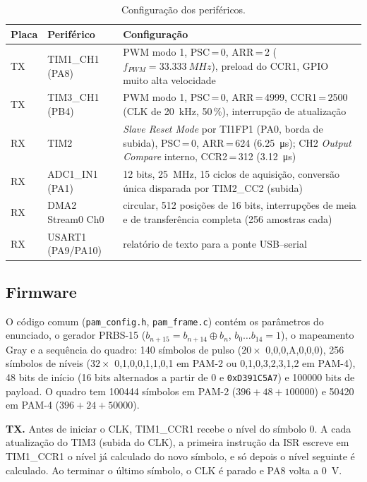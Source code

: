 \documentclass[12pt,a4paper]{article}
\begin{document}
\begin{table}[H]
\centering
\caption{Configuração dos periféricos.}
\label{tab:ioc}
\small
\begin{tabularx}{\textwidth}{l l X}
\toprule
Placa & Periférico & Configuração \\
\midrule
TX & TIM1\_CH1 (PA8) & PWM modo 1, PSC\,=\,0, ARR\,=\,2 ($f_{PWM}=\SI{33,333}{MHz}$), preload do CCR1, GPIO muito alta velocidade \\
TX & TIM3\_CH1 (PB4) & PWM modo 1, PSC\,=\,0, ARR\,=\,4999, CCR1\,=\,2500 (CLK de \SI{20}{kHz}, 50\,\%), interrupção de atualização \\
RX & TIM2 & \textit{Slave Reset Mode} por TI1FP1 (PA0, borda de subida), PSC\,=\,0, ARR\,=\,624 (\SI{6,25}{\micro\second}); CH2 \textit{Output Compare} interno, CCR2\,=\,312 (\SI{3,12}{\micro\second}) \\
RX & ADC1\_IN1 (PA1) & 12 bits, \SI{25}{MHz}, 15 ciclos de aquisição, conversão única disparada por TIM2\_CC2 (subida) \\
RX & DMA2 Stream0 Ch0 & circular, 512 posições de 16 bits, interrupções de meia e de transferência completa (256 amostras cada) \\
RX & USART1 (PA9/PA10) & relatório de texto para a ponte USB--serial \\
\bottomrule
\end{tabularx}
\end{table}

\subsection{Firmware}

O código comum (\texttt{pam\_config.h}, \texttt{pam\_frame.c}) contém os parâmetros do enunciado,
o gerador PRBS-15 ($b_{n+15} = b_{n+14}\oplus b_n$, $b_0\ldots b_{14}=1$), o mapeamento Gray e a
sequência do quadro: 140 símbolos de pulso ($20\times$ 0,0,0,A,0,0,0), 256 símbolos de níveis
($32\times$ 0,1,0,0,1,1,0,1 em PAM-2 ou 0,1,0,3,2,3,1,2 em PAM-4), 48 bits de início
(16 bits alternados a partir de 0 e \texttt{0xD391C5A7}) e \num{100000} bits de payload.
O quadro tem \num{100444} símbolos em PAM-2 ($396+48+\num{100000}$) e \num{50420} em PAM-4
($396+24+\num{50000}$).

\textbf{TX.} Antes de iniciar o CLK, TIM1\_CCR1 recebe o nível do símbolo 0. A cada atualização do
TIM3 (subida do CLK), a primeira instrução da ISR escreve em TIM1\_CCR1 o nível já calculado do novo
símbolo, e só depois o nível seguinte é calculado. Ao terminar o último símbolo, o CLK é parado e PA8
volta a \SI{0}{V}.
\end{document}
